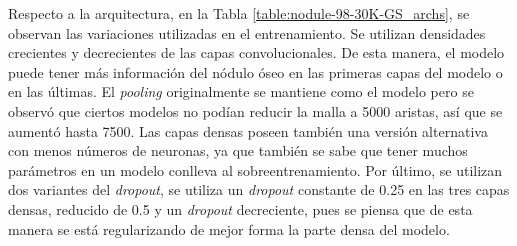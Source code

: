 \begin{table}[h]
\centering
{}
\caption[Nodule-98-30K-GS-*: Arquitecturas]{, arquitecturas utilizadas.}
\label{table:nodule-98-30K-GS_archs}
\end{table}

Respecto a la arquitectura, en la Tabla \ref{table:nodule-98-30K-GS_archs}, se observan las variaciones utilizadas en el entrenamiento. Se utilizan densidades crecientes y decrecientes de las capas convolucionales. De esta manera, el modelo puede tener más información del nódulo óseo en las primeras capas del modelo o en las últimas. El \textit{pooling} originalmente se mantiene como el modelo  pero se observó que ciertos modelos no podían reducir la malla a 5000 aristas, así que se aumentó hasta 7500. Las capas densas poseen también una versión alternativa con menos números de neuronas, ya que también se sabe que tener muchos parámetros en un modelo conlleva al sobreentrenamiento. Por último, se utilizan dos variantes del \textit{dropout}, se utiliza un \textit{dropout} constante de 0.25 en las tres capas densas, reducido de 0.5 y un \textit{dropout} decreciente, pues se piensa que de esta manera se está regularizando de mejor forma la parte densa del modelo.

